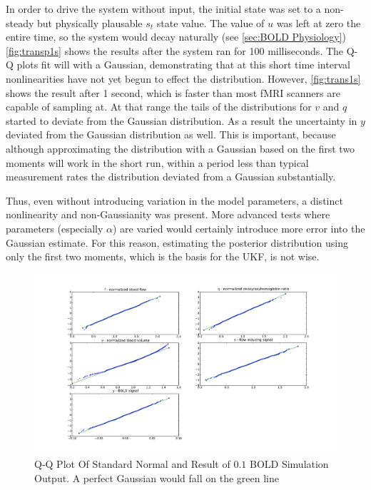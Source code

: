 In order to drive the system without input, the initial state was set
to a non-steady but physically 
plausable $s_t$ state value. The value of $u$ was left at zero 
the entire time, so the 
system would decay naturally (see \autoref{sec:BOLD Physiology})
\autoref{fig:transp1s} shows the results after the
system ran for 100 milliseconds. 
The Q-Q plots fit will with a Gaussian, demonstrating that at this short
time interval nonlinearities have not yet begun to effect the distribution.
However, \autoref{fig:trans1s} shows the result after 1 second, which is faster
than most \ac{fMRI} scanners are capable of sampling at. At that range the tails 
of the distributions for $v$ and $q$ started to deviate from the
Gaussian distribution. As a result the uncertainty in $y$ deviated from
the Gaussian distribution as well. This is important, because although 
approximating the distribution with a Gaussian based on the first two
moments will work in the short run, within a period less than typical
measurement rates the distribution deviated from a Gaussian substantially. 

Thus, even without introducing variation in the model parameters,
a distinct nonlinearity and non-Gaussianity was present. 
More advanced tests where parameters (especially $\alpha$) are varied
would certainly introduce more error into the Gaussian estimate. 
For this reason, estimating the posterior distribution using only 
the first two moments, which is the basis for the \ac{UKF}, is not wise. 

\begin{figure}
\centering
\includegraphics[trim=6cm .75cm 6cm .75cm,width=16cm]{images/gauss_step_point1sec_3sigma.pdf}
\caption[Q-Q Plot Of Standard Normal and Result of $0.1$s BOLD Simulation Output]
{Q-Q Plot Of Standard Normal and Result of $0.1$ BOLD Simulation Output. A
perfect Gaussian would fall on the green line}
\label{fig:transp1s}
\end{figure}

